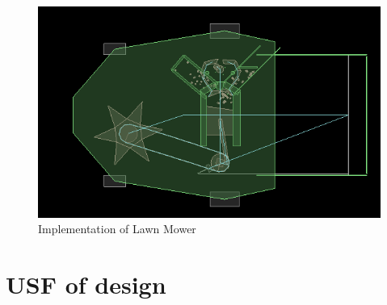 \documentclass[12pt,a4paper]{report}
\begin{document}
\begin{figure}[ht!]
\centering
\includegraphics[scale=0.6]{lawnMower}
\caption{Implementation of Lawn Mower}
\end{figure}

\pagebreak

\section*{USF of design}
\end{document}
